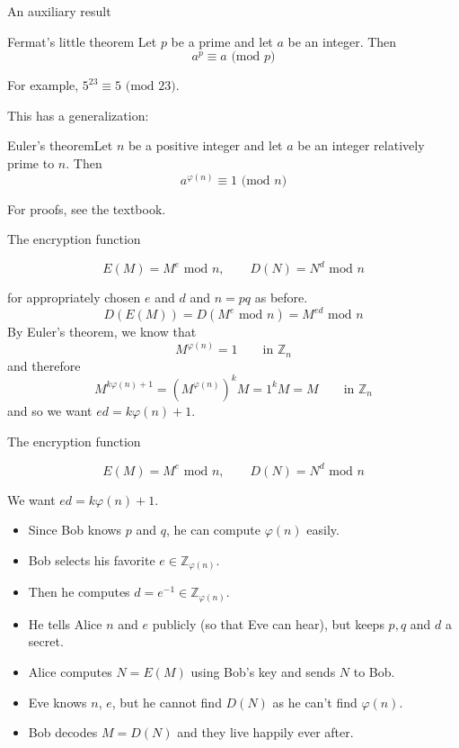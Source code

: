 \documentclass{beamer}
\def\bl[#1]#2{\begin{block}{#1}#2\end{block}}
\def\itemb{\begin{itemize}}
\def\iteme{\end{itemize}}
\begin{document}
\begin{frame}{An auxiliary result}
\bl[Fermat's little theorem]{
Let $p$ be a prime and let $a$ be an integer. Then
\[
a^p\equiv a\textrm{ (mod $p$)}
\]}
For example, $5^{23}\equiv 5\textrm{ (mod 23)}$.
\vspace{0.5cm}

This has a generalization:

\bl[Euler's theorem]{Let $n$ be a positive integer and let $a$ be an integer relatively prime to $n$. Then
\[
a^{\varphi(n)}\equiv 1\textrm{ (mod $n$)}
\]}
For proofs, see the textbook.
\end{frame}

\begin{frame}{The encryption function}
\bl[]{
\[
E(M)=M^e\textrm{ mod }n,\qquad D(N)=N^d\textrm{ mod }n
\]}
for appropriately chosen $e$ and $d$ and $n=pq$ as before.
\[
D(E(M))=D(M^e\textrm{ mod }n)=M^{ed}\textrm{ mod }n
\]
By Euler's theorem, we know that 
\[
M^{\varphi(n)}=1\qquad\textrm{in }\mathbb{Z}_n
\]
and therefore
\[
M^{k\varphi(n)+1}=(M^{\varphi(n)})^kM=1^kM=M\qquad\textrm{in }\mathbb{Z}_n
\]
and so we want $ed=k\varphi(n)+1$.
\end{frame}

\begin{frame}{The encryption function}
\bl[]{
\[
E(M)=M^e\textrm{ mod }n,\qquad D(N)=N^d\textrm{ mod }n
\]}
We want $ed=k\varphi(n)+1$. 
\itemb
\item Since Bob knows $p$ and $q$, he can compute $\varphi(n)$ easily. 
\item Bob selects his favorite $e\in\mathbb{Z}_{\varphi(n)}$. 
\item Then he computes $d=e^{-1}\in\mathbb{Z}_{\varphi(n)}$.
\item He tells Alice $n$ and $e$ publicly (so that Eve can hear), but keeps $p,q$ and $d$ a secret.
\item Alice computes $N=E(M)$ using Bob's key and sends $N$ to Bob.
\item Eve knows $n$, $e$, but he cannot find $D(N)$ as he can't find $\varphi(n)$.
\item Bob decodes $M=D(N)$ and they live happily ever after.
\iteme
\end{frame}
\end{document}
